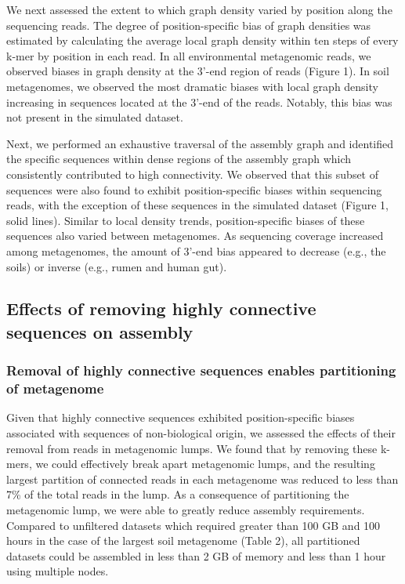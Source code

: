 \documentclass[10pt]{article}
\begin{document}
We next assessed the extent to which graph density varied by position along the sequencing reads.  The degree of position-specific bias of graph densities was estimated by calculating the average local graph density within ten steps of every k-mer by position in each read.  In all environmental metagenomic reads, we observed biases in graph density at the 3'-end region of reads (Figure 1).  In soil metagenomes, we observed the most dramatic biases with local graph density increasing in sequences located at the 3'-end of the reads.  Notably, this bias was not present in the simulated dataset.  

Next, we performed an exhaustive traversal of the assembly graph and identified the specific sequences within dense regions of the assembly graph which consistently contributed to high connectivity.  We observed that this subset of sequences were also found to exhibit position-specific biases within sequencing reads, with the exception of these sequences in the simulated dataset (Figure 1, solid lines).  Similar to local density trends, position-specific biases of these sequences also varied between metagenomes.  As sequencing coverage increased among metagenomes, the amount of 3'-end bias appeared to decrease (e.g., the soils) or inverse (e.g., rumen and human gut).

\subsection*{Effects of removing highly connective sequences on assembly}

\subsubsection*{Removal of highly connective sequences enables partitioning of metagenome}
Given that highly connective sequences exhibited position-specific biases associated with sequences of non-biological origin, we assessed the effects of their removal from reads in metagenomic lumps.  We found that by removing these k-mers, we could effectively break apart metagenomic lumps, and the resulting largest partition of connected reads in each metagenome was reduced to less than 7\% of the total reads in the lump.  As a consequence of partitioning the metagenomic lump, we were able to greatly reduce assembly requirements.  Compared to unfiltered datasets which required greater than 100 GB and 100 hours in the case of the largest soil metagenome (Table 2), all partitioned datasets could be assembled in less than 2 GB of memory and less than 1 hour using multiple nodes. 
\end{document}

